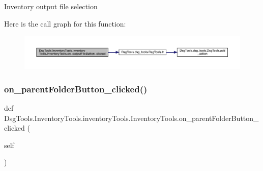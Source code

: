 \begin{DoxyVerb}Inventory output file selection
\end{DoxyVerb}
 Here is the call graph for this function\+:
\nopagebreak
\begin{figure}[H]
\begin{center}
\leavevmode
\includegraphics[width=350pt]{class_dsg_tools_1_1_inventory_tools_1_1inventory_tools_1_1_inventory_tools_a59555f35e462d65997feb8394e97d6aa_cgraph}
\end{center}
\end{figure}
\mbox{\label{class_dsg_tools_1_1_inventory_tools_1_1inventory_tools_1_1_inventory_tools_a649ffb9c920baee6c52f8477c9fc3a0e}} 
\subsubsection{\texorpdfstring{on\+\_\+parent\+Folder\+Button\+\_\+clicked()}{on\_parentFolderButton\_clicked()}}
{\footnotesize\ttfamily def Dsg\+Tools.\+Inventory\+Tools.\+inventory\+Tools.\+Inventory\+Tools.\+on\+\_\+parent\+Folder\+Button\+\_\+clicked (\begin{DoxyParamCaption}\item[{}]{self }\end{DoxyParamCaption})}

